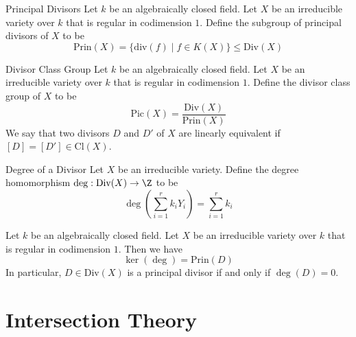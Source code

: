 \documentclass[a4paper]{article}
\begin{document}
\begin{defn}{Principal Divisors}{} Let $k$ be an algebraically closed field. Let $X$ be an irreducible variety over $k$ that is regular in codimension $1$. Define the subgroup of principal divisors of $X$ to be $$\text{Prin}(X)=\{\text{div}(f)\;|\;f\in K(X)\}\leq\text{Div}(X)$$
\end{defn}

\begin{defn}{Divisor Class Group}{} Let $k$ be an algebraically closed field. Let $X$ be an irreducible variety over $k$ that is regular in codimension $1$. Define the divisor class group of $X$ to be $$\text{Pic}(X)=\frac{\text{Div}(X)}{\text{Prin}(X)}$$ We say that two divisors $D$ and $D'$ of $X$ are linearly equivalent if $[D]=[D']\in\text{Cl}(X)$. 
\end{defn}

\begin{defn}{Degree of a Divisor}{} Let $X$ be an irreducible variety. Define the degree homomorphism $\deg:\text{Div}(X)\to\Z$ to be $$\deg\left(\sum_{i=1}^rk_iY_i\right)=\sum_{i=1}^rk_i$$ 
\end{defn}

\begin{prp}{}{} Let $k$ be an algebraically closed field. Let $X$ be an irreducible variety over $k$ that is regular in codimension $1$. Then we have $$\ker(\deg)=\text{Prin}(D)$$ In particular, $D\in\text{Div}(X)$ is a principal divisor if and only if $\deg(D)=0$. 
\end{prp}

\pagebreak
\section{Intersection Theory}
\end{document}
